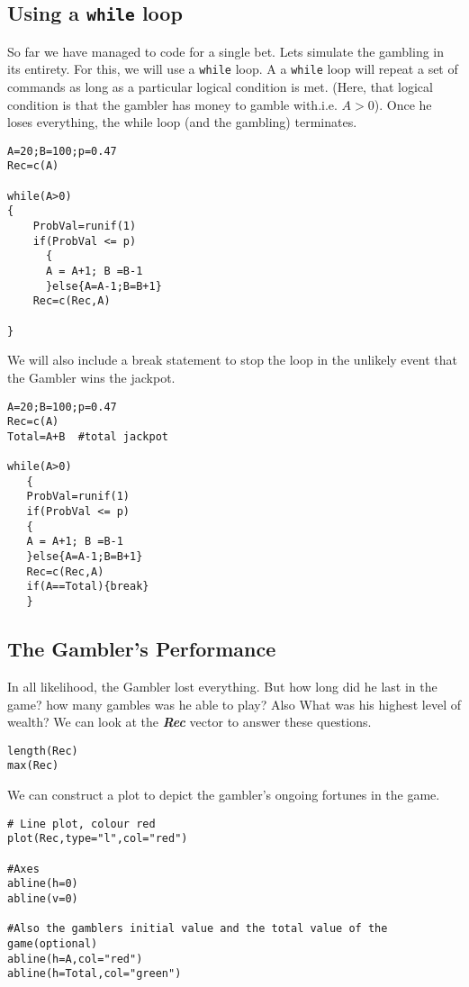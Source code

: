 \documentclass[11pt]{article} %
\begin{document}
\subsection{Using a \texttt{while} loop}
So far we have managed to code for a single bet. Lets simulate the gambling in its entirety.
For this, we will use a \texttt{while} loop. A a \texttt{while} loop will repeat a set of commands as long as a particular logical condition is met. (Here, that logical condition is that the gambler has money to gamble with.i.e. $A >0$). Once he loses everything, the while loop (and the gambling) terminates.
\begin{framed}
\begin{verbatim}
A=20;B=100;p=0.47
Rec=c(A)

while(A>0)
{
    ProbVal=runif(1)
    if(ProbVal <= p)
      {
      A = A+1; B =B-1
      }else{A=A-1;B=B+1}
    Rec=c(Rec,A)

}
\end{verbatim}
\end{framed}
We will also include a break statement to stop the loop in the unlikely event that the Gambler wins the jackpot.
\begin{framed}
\begin{verbatim}
A=20;B=100;p=0.47
Rec=c(A)
Total=A+B  #total jackpot

while(A>0)
   { 
   ProbVal=runif(1)
   if(ProbVal <= p)
   {
   A = A+1; B =B-1
   }else{A=A-1;B=B+1}
   Rec=c(Rec,A)
   if(A==Total){break}
   }
\end{verbatim}
\end{framed}
\newpage
\subsection{The Gambler's Performance}
In all likelihood, the Gambler lost everything. But how long did he last in the game? how many gambles was he able to play? Also What was his highest level of wealth?
We can look at the \textbf{\textit{Rec}} vector to answer these questions.
\begin{framed}
\begin{verbatim}
length(Rec)
max(Rec)
\end{verbatim}
\end{framed}

We can construct a plot to depict the gambler's ongoing fortunes in the game.
\begin{framed}
\begin{verbatim}
# Line plot, colour red
plot(Rec,type="l",col="red")

#Axes
abline(h=0)
abline(v=0)

#Also the gamblers initial value and the total value of the game(optional)
abline(h=A,col="red")
abline(h=Total,col="green")
\end{verbatim}
\end{framed}
\newpage
\end{document}
